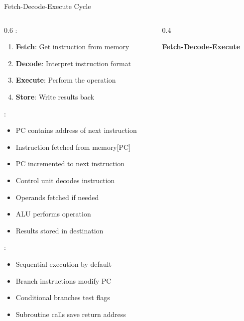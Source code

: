 \begin{frame}{Fetch-Decode-Execute Cycle}
\begin{columns}
\begin{column}{0.6\textwidth}
:
\begin{enumerate}
\item \textbf{Fetch}: Get instruction from memory
\item \textbf{Decode}: Interpret instruction format
\item \textbf{Execute}: Perform the operation
\item \textbf{Store}: Write results back
\end{enumerate}

\vspace{0.3cm}
:
\begin{itemize}
\item PC contains address of next instruction
\item Instruction fetched from memory[PC]
\item PC incremented to next instruction
\item Control unit decodes instruction
\item Operands fetched if needed
\item ALU performs operation
\item Results stored in destination
\end{itemize}

\vspace{0.3cm}
:
\begin{itemize}
\item Sequential execution by default
\item Branch instructions modify PC
\item Conditional branches test flags
\item Subroutine calls save return address
\end{itemize}
\end{column}
\begin{column}{0.4\textwidth}
\begin{center}
\textbf{Fetch-Decode-Execute}
\vspace{0.3cm}

\end{center}
\end{column}
\end{columns}
\end{frame}

